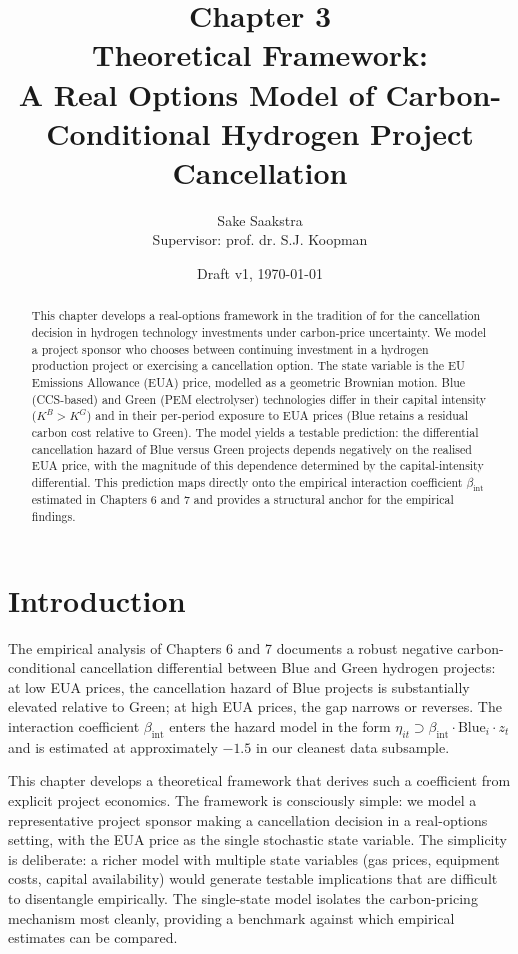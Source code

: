 \documentclass[11pt,a4paper]{article}
\title{\textbf{Chapter 3}\\[0.3em] Theoretical Framework:\\
A Real Options Model of Carbon-Conditional Hydrogen Project Cancellation}
\author{Sake Saakstra \\ \small Supervisor: prof. dr. S.J. Koopman}
\date{Draft v1, \today}
\newcommand{\bint}{\beta_{\mathrm{int}}}
\newcommand{\KB}{K^{B}}
\newcommand{\KG}{K^{G}}
\begin{document}
\maketitle

\begin{abstract}
This chapter develops a real-options framework in the tradition of \citet{dixit1994investment} for the cancellation decision in hydrogen technology investments under carbon-price uncertainty. We model a project sponsor who chooses between continuing investment in a hydrogen production project or exercising a cancellation option. The state variable is the EU Emissions Allowance (EUA) price, modelled as a geometric Brownian motion. Blue (CCS-based) and Green (PEM electrolyser) technologies differ in their capital intensity ($\KB > \KG$) and in their per-period exposure to EUA prices (Blue retains a residual carbon cost relative to Green). The model yields a testable prediction: the differential cancellation hazard of Blue versus Green projects depends negatively on the realised EUA price, with the magnitude of this dependence determined by the capital-intensity differential. This prediction maps directly onto the empirical interaction coefficient $\bint$ estimated in Chapters 6 and 7 and provides a structural anchor for the empirical findings.
\end{abstract}

\section{Introduction}
\label{sec:ch3-intro}

The empirical analysis of Chapters 6 and 7 documents a robust negative carbon-conditional cancellation differential between Blue and Green hydrogen projects: at low EUA prices, the cancellation hazard of Blue projects is substantially elevated relative to Green; at high EUA prices, the gap narrows or reverses. The interaction coefficient $\bint$ enters the hazard model in the form $\eta_{it} \supset \bint \cdot \mathrm{Blue}_i \cdot z_t$ and is estimated at approximately $-1.5$ in our cleanest data subsample.

This chapter develops a theoretical framework that derives such a coefficient from explicit project economics. The framework is consciously simple: we model a representative project sponsor making a cancellation decision in a real-options setting, with the EUA price as the single stochastic state variable. The simplicity is deliberate: a richer model with multiple state variables (gas prices, equipment costs, capital availability) would generate testable implications that are difficult to disentangle empirically. The single-state model isolates the carbon-pricing mechanism most cleanly, providing a benchmark against which empirical estimates can be compared.
\end{document}
